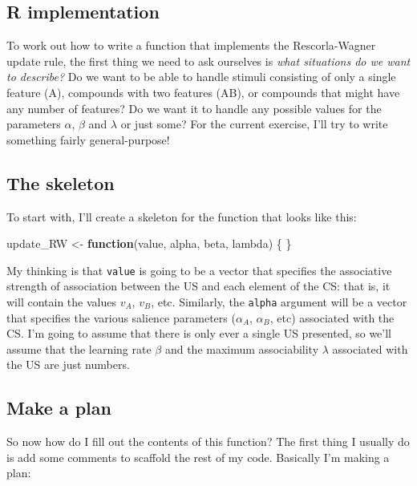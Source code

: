 \documentclass[]{book}
\newenvironment{Shaded}{\begin{snugshade}}{\end{snugshade}}
\newcommand{\ControlFlowTok}[1]{\textcolor[rgb]{0.13,0.29,0.53}{\textbf{#1}}}
\newcommand{\NormalTok}[1]{#1}
\newcommand{\StringTok}[1]{\textcolor[rgb]{0.31,0.60,0.02}{#1}}
\begin{document}
\hypertarget{r-implementation}{%
\subsection{R implementation}\label{r-implementation}}

To work out how to write a function that implements the Rescorla-Wagner update rule, the first thing we need to ask ourselves is \emph{what situations do we want to describe?} Do we want to be able to handle stimuli consisting of only a single feature (A), compounds with two features (AB), or compounds that might have any number of features? Do we want it to handle any possible values for the parameters \(\alpha\), \(\beta\) and \(\lambda\) or just some? For the current exercise, I'll try to write something fairly general-purpose!

\hypertarget{the-skeleton}{%
\subsection{The skeleton}\label{the-skeleton}}

To start with, I'll create a skeleton for the function that looks like this:

\begin{Shaded}
\begin{Highlighting}[]
\NormalTok{update_RW <-}\StringTok{ }\ControlFlowTok{function}\NormalTok{(value, alpha, beta, lambda) \{}
\NormalTok{\}}
\end{Highlighting}
\end{Shaded}

My thinking is that \texttt{value} is going to be a vector that specifies the associative strength of association between the US and each element of the CS: that is, it will contain the values \(v_A\), \(v_B\), etc. Similarly, the \texttt{alpha} argument will be a vector that specifies the various salience parameters (\(\alpha_A\), \(\alpha_B\), etc) associated with the CS. I'm going to assume that there is only ever a single US presented, so we'll assume that the learning rate \(\beta\) and the maximum associability \(\lambda\) associated with the US are just numbers.

\hypertarget{make-a-plan}{%
\subsection{Make a plan}\label{make-a-plan}}

So now how do I fill out the contents of this function? The first thing I usually do is add some comments to scaffold the rest of my code. Basically I'm making a plan:
\end{document}

